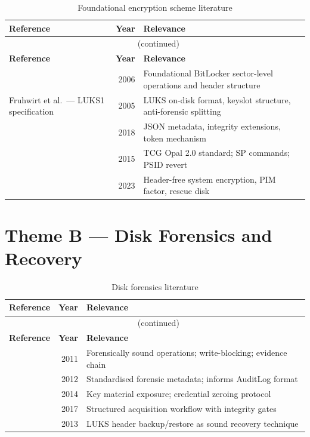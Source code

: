 \documentclass[11pt,a4paper]{report}
\begin{document}
\begin{longtable}{@{}p{5.5cm}rp{7cm}@{}}
\caption{Foundational encryption scheme literature}\label{tab:themeA}\\
\toprule
\textbf{Reference} & \textbf{Year} & \textbf{Relevance} \\
\midrule
\endfirsthead
\multicolumn{3}{c}{\tablename\ \thetable{} (continued)}\\
\toprule \textbf{Reference} & \textbf{Year} & \textbf{Relevance} \\ \midrule
\endhead
\citet{ferguson2006} & 2006 & Foundational BitLocker sector-level operations and header structure \\
Fruhwirt et al.\ --- LUKS1 specification & 2005 & LUKS on-disk format, keyslot structure, anti-forensic splitting \\
\citet{broz2018} & 2018 & JSON metadata, integrity extensions, token mechanism \\
\citet{tcg2015} & 2015 & TCG Opal 2.0 standard; SP commands; PSID revert \\
\citet{menz2023} & 2023 & Header-free system encryption, PIM factor, rescue disk \\
\bottomrule
\end{longtable}

\section{Theme B --- Disk Forensics and Recovery}

\begin{longtable}{@{}p{5.5cm}rp{7cm}@{}}
\caption{Disk forensics literature}\label{tab:themeB}\\
\toprule \textbf{Reference} & \textbf{Year} & \textbf{Relevance} \\ \midrule
\endfirsthead
\multicolumn{3}{c}{\tablename\ \thetable{} (continued)}\\ \toprule \textbf{Reference} & \textbf{Year} & \textbf{Relevance} \\ \midrule
\endhead
\citet{casey2011} & 2011 & Forensically sound operations; write-blocking; evidence chain \\
\citet{garfinkel2012} & 2012 & Standardised forensic metadata; informs AuditLog format \\
\citet{ligh2014} & 2014 & Key material exposure; credential zeroing protocol \\
\citet{harbawi2017} & 2017 & Structured acquisition workflow with integrity gates \\
\citet{poisel2013} & 2013 & LUKS header backup/restore as sound recovery technique \\
\bottomrule
\end{longtable}
\end{document}

